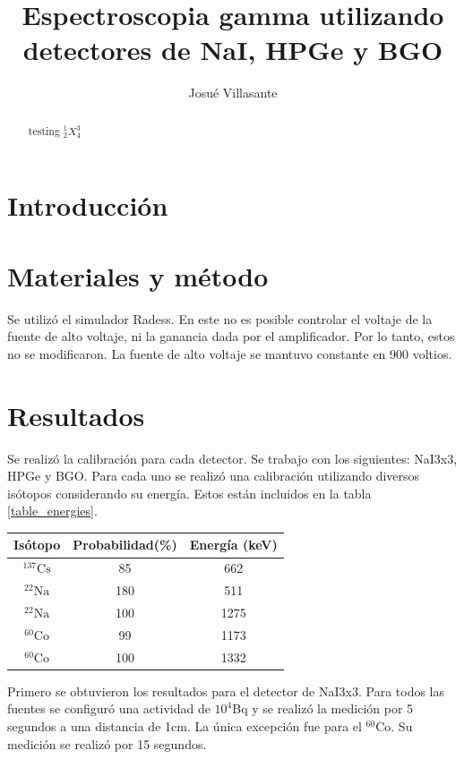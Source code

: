 \documentclass[onecolumn]{article}
\author{Josué Villasante}
\title{Espectroscopia gamma utilizando detectores de NaI, HPGe y BGO}
\begin{document}
	\maketitle
	\begin{abstract}
		testing
		${}^1_2X^3_4$
	\end{abstract}

	\section{Introducción}
	
	\section{Materiales y método}
		Se utilizó el simulador Radess. En este no es posible controlar el voltaje de la fuente de alto voltaje, ni la ganancia dada por el amplificador. Por lo tanto, estos no se modificaron. La fuente de alto voltaje se mantuvo constante en 900 voltios.

	\section{Resultados}	
		Se realizó la calibración para cada detector. Se trabajo con los siguientes: NaI3x3, HPGe y BGO. Para cada uno se realizó una calibración utilizando diversos isótopos considerando su energía. Estos están incluidos en la tabla \ref{table_energies}.

		\begin{center}
			{\renewcommand{\arraystretch}{1.5}
			\renewcommand{\tabcolsep}{0.2cm}
			\label{table_energies}
			\begin{tabular}{ c c c }
				\hline
				Isótopo & Probabilidad(\%) & Energía (keV) \\
				\hline
				${}^{137}\mathrm{Cs}$ & 85 & 662 \\ 
				${}^{22}\mathrm{Na}$ & 180 & 511 \\ 
				${}^{22}\mathrm{Na}$ & 100 & 1275 \\ 
				${}^{60}\mathrm{Co}$ & 99 & 1173 \\ 
				${}^{60}\mathrm{Co}$ & 100 & 1332
			\end{tabular}}
		\end{center}

		Primero se obtuvieron los resultados para el detector de NaI3x3. Para todos las fuentes se configuró una actividad de $10^4$Bq y se realizó la medición por 5 segundos a una distancia de 1cm. La única excepción fue para el ${}^{60}\mathrm{Co}$. Su medición se realizó por 15 segundos.
\end{document}
